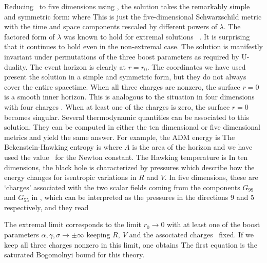 Reducing \metric\  to five dimensions using \dimensionalreduction ,
 the solution takes
the remarkably simple and symmetric form:
\eqn\solnfd{ds_5^2 =  - \lambda^{-2/3} \(1-{r_0^2 \over r^2}\) dt^2 + 
\lambda^{1/3}
\[\(1-{r_0^2 \over r^2}\)^{-1} dr^2 + r^2 d \Omega_3^2 \right]~,}
where
\eqn{}
This is just the five-dimensional Schwarzschild metric with the time
and space components rescaled by different powers of $\lambda$. 
The factored
form of $\lambda$
 was known  to hold for extremal solutions \einstein\  \mirjam . 
It is surprising that
it continues to hold even in the non-extremal case. The solution is
manifestly invariant under permutations of the three boost parameters as
required by U-duality.
The event horizon is clearly at $r=r_0$.
The coordinates we have used present the solution
in a simple and symmetric form, but they do not always cover the entire
spacetime. When all three charges are nonzero, the surface $r=0$ is
a smooth inner horizon. This is analogous to the situation in four
dimensions with four charges \cvetd  .
 When at least one of the charges
is zero, the surface $r=0$ becomes singular.
Several thermodynamic quantities can be associated to
this solution. They can be computed in either the ten dimensional or
five dimensional metrics and yield the same answer. For example, the
ADM energy is 
\eqn{}
The Bekenstein-Hawking entropy is
\eqn{}
where $A$ is the area of the horizon and
we have used the value \gten\ for the Newton constant.
The Hawking temperature is
\eqn{}
In ten dimensions, the black hole is characterized by
pressures which describe how the energy changes for isentropic
variations in $R$ and $V$. In five dimensions, these are `charges' 
associated
with the two scalar fields coming from the components
$G_{99}$ and $G_{55}$ in \metric , which 
can be interpreted as the pressures in the directions 
9 and 5 respectively, and they read
\eqn{}


The extremal limit corresponds to the limit $ r_0 \rightarrow 0$
with at least one of the boost parameters
$\alpha , \gamma , \sigma \rightarrow \pm \infty $ keeping
$R, \ V$ and the associated charges \charges\ fixed.
If we keep all three charges nonzero in this limit, one obtains
\eqn{}
The first equation is the saturated Bogomolnyi bound for this theory.


